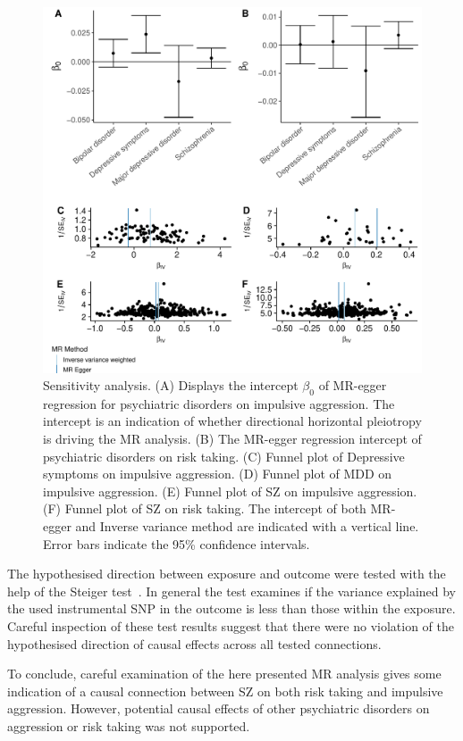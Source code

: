 \begin{figure}[htpb]
  \centering
  \includegraphics[width=0.9\linewidth]{figures/sensitvity_plot.pdf}
  \caption{Sensitivity analysis.
    (A) Displays the intercept $\beta_0$ of MR-egger regression for psychiatric disorders on impulsive aggression. The intercept is an indication of whether directional horizontal pleiotropy is driving the MR analysis.
    (B) The MR-egger regression intercept of psychiatric disorders on risk taking.
    (C) Funnel plot of Depressive symptoms on impulsive aggression. 
    (D) Funnel plot of MDD on impulsive aggression. 
    (E) Funnel plot of SZ on impulsive aggression. 
    (F) Funnel plot of SZ on risk taking. 
    The intercept of both MR-egger and Inverse variance method are indicated with a vertical line.
    Error bars indicate the 95\% confidence intervals.
  }\label{fig:sensitivity}
\end{figure}

The hypothesised direction between exposure and outcome were tested with the help of the Steiger test~\cite{Steiger1980}.
In general the test examines if the variance explained by the used instrumental SNP in the outcome is less than those within the exposure. 
Careful inspection of these test results suggest that there were no violation of the hypothesised direction of causal effects across all tested connections.

To conclude, careful examination of the here presented MR analysis gives some indication of a causal connection between SZ on both risk taking and impulsive aggression.
However, potential causal effects of other psychiatric disorders on aggression or risk taking was not supported.
